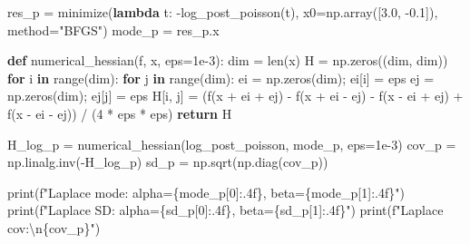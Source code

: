 \documentclass[
  letterpaper,
  DIV=11,
  numbers=noendperiod]{scrartcl}
\newenvironment{Shaded}{\begin{snugshade}}{\end{snugshade}}
\newcommand{\BuiltInTok}[1]{\textcolor[rgb]{0.00,0.23,0.31}{#1}}
\newcommand{\CharTok}[1]{\textcolor[rgb]{0.13,0.47,0.30}{#1}}
\newcommand{\ControlFlowTok}[1]{\textcolor[rgb]{0.00,0.23,0.31}{\textbf{#1}}}
\newcommand{\DecValTok}[1]{\textcolor[rgb]{0.68,0.00,0.00}{#1}}
\newcommand{\FloatTok}[1]{\textcolor[rgb]{0.68,0.00,0.00}{#1}}
\newcommand{\KeywordTok}[1]{\textcolor[rgb]{0.00,0.23,0.31}{\textbf{#1}}}
\newcommand{\NormalTok}[1]{\textcolor[rgb]{0.00,0.23,0.31}{#1}}
\newcommand{\OperatorTok}[1]{\textcolor[rgb]{0.37,0.37,0.37}{#1}}
\newcommand{\SpecialCharTok}[1]{\textcolor[rgb]{0.37,0.37,0.37}{#1}}
\newcommand{\SpecialStringTok}[1]{\textcolor[rgb]{0.13,0.47,0.30}{#1}}
\newcommand{\StringTok}[1]{\textcolor[rgb]{0.13,0.47,0.30}{#1}}
\begin{document}
\begin{Shaded}
\begin{Highlighting}[]
\NormalTok{res\_p }\OperatorTok{=}\NormalTok{ minimize(}\KeywordTok{lambda}\NormalTok{ t: }\OperatorTok{{-}}\NormalTok{log\_post\_poisson(t), x0}\OperatorTok{=}\NormalTok{np.array([}\FloatTok{3.0}\NormalTok{, }\OperatorTok{{-}}\FloatTok{0.1}\NormalTok{]),}
\NormalTok{                 method}\OperatorTok{=}\StringTok{"BFGS"}\NormalTok{)}
\NormalTok{mode\_p }\OperatorTok{=}\NormalTok{ res\_p.x}

\KeywordTok{def}\NormalTok{ numerical\_hessian(f, x, eps}\OperatorTok{=}\FloatTok{1e{-}3}\NormalTok{):}
\NormalTok{    dim }\OperatorTok{=} \BuiltInTok{len}\NormalTok{(x)}
\NormalTok{    H }\OperatorTok{=}\NormalTok{ np.zeros((dim, dim))}
    \ControlFlowTok{for}\NormalTok{ i }\KeywordTok{in} \BuiltInTok{range}\NormalTok{(dim):}
        \ControlFlowTok{for}\NormalTok{ j }\KeywordTok{in} \BuiltInTok{range}\NormalTok{(dim):}
\NormalTok{            ei }\OperatorTok{=}\NormalTok{ np.zeros(dim)}\OperatorTok{;}\NormalTok{ ei[i] }\OperatorTok{=}\NormalTok{ eps}
\NormalTok{            ej }\OperatorTok{=}\NormalTok{ np.zeros(dim)}\OperatorTok{;}\NormalTok{ ej[j] }\OperatorTok{=}\NormalTok{ eps}
\NormalTok{            H[i, j] }\OperatorTok{=}\NormalTok{ (f(x }\OperatorTok{+}\NormalTok{ ei }\OperatorTok{+}\NormalTok{ ej) }\OperatorTok{{-}}\NormalTok{ f(x }\OperatorTok{+}\NormalTok{ ei }\OperatorTok{{-}}\NormalTok{ ej)}
                       \OperatorTok{{-}}\NormalTok{ f(x }\OperatorTok{{-}}\NormalTok{ ei }\OperatorTok{+}\NormalTok{ ej) }\OperatorTok{+}\NormalTok{ f(x }\OperatorTok{{-}}\NormalTok{ ei }\OperatorTok{{-}}\NormalTok{ ej)) }\OperatorTok{/}\NormalTok{ (}\DecValTok{4} \OperatorTok{*}\NormalTok{ eps }\OperatorTok{*}\NormalTok{ eps)}
    \ControlFlowTok{return}\NormalTok{ H}

\NormalTok{H\_log\_p }\OperatorTok{=}\NormalTok{ numerical\_hessian(log\_post\_poisson, mode\_p, eps}\OperatorTok{=}\FloatTok{1e{-}3}\NormalTok{)}
\NormalTok{cov\_p }\OperatorTok{=}\NormalTok{ np.linalg.inv(}\OperatorTok{{-}}\NormalTok{H\_log\_p)}
\NormalTok{sd\_p  }\OperatorTok{=}\NormalTok{ np.sqrt(np.diag(cov\_p))}

\BuiltInTok{print}\NormalTok{(}\SpecialStringTok{f"Laplace mode:  alpha=}\SpecialCharTok{\{}\NormalTok{mode\_p[}\DecValTok{0}\NormalTok{]}\SpecialCharTok{:.4f\}}\SpecialStringTok{, beta=}\SpecialCharTok{\{}\NormalTok{mode\_p[}\DecValTok{1}\NormalTok{]}\SpecialCharTok{:.4f\}}\SpecialStringTok{"}\NormalTok{)}
\BuiltInTok{print}\NormalTok{(}\SpecialStringTok{f"Laplace SD:    alpha=}\SpecialCharTok{\{}\NormalTok{sd\_p[}\DecValTok{0}\NormalTok{]}\SpecialCharTok{:.4f\}}\SpecialStringTok{, beta=}\SpecialCharTok{\{}\NormalTok{sd\_p[}\DecValTok{1}\NormalTok{]}\SpecialCharTok{:.4f\}}\SpecialStringTok{"}\NormalTok{)}
\BuiltInTok{print}\NormalTok{(}\SpecialStringTok{f"Laplace cov:}\CharTok{\textbackslash{}n}\SpecialCharTok{\{}\NormalTok{cov\_p}\SpecialCharTok{\}}\SpecialStringTok{"}\NormalTok{)}
\end{Highlighting}
\end{Shaded}
\end{document}
